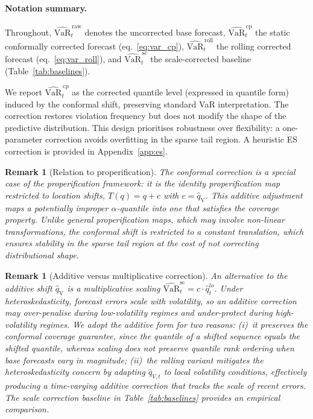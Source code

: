 \documentclass[preprint,11pt,authoryear]{elsarticle}
\newtheorem{remark}[theorem]{Remark}
\newcommand{\VaR}{\mathrm{VaR}}
\newcommand{\1}{\boldsymbol{1}}
\newcommand{\qV}{\hat{q}_{\scriptscriptstyle\mathrm{V}}}
\begin{document}
	\paragraph{Notation summary.}
	Throughout, $\widehat{\VaR}^{\,\mathrm{raw}}_t$ denotes the uncorrected base forecast, $\widehat{\VaR}^{\,\mathrm{cp}}_t$ the static conformally corrected forecast (eq.~\ref{eq:var_cp}), $\widehat{\VaR}^{\,\mathrm{roll}}_t$ the rolling corrected forecast (eq.~\ref{eq:var_roll}), and $\widehat{\VaR}^{\,\mathrm{sc}}_t$ the scale-corrected baseline (Table~\ref{tab:baselines}).

	We report $\widehat{\VaR}_t^{\,\mathrm{cp}}$ as the corrected quantile level (expressed in quantile form) induced by the conformal shift, preserving standard VaR interpretation.
	The correction restores violation frequency but does not
	modify the shape of the predictive distribution. This design
	prioritises robustness over flexibility: a one-parameter
	correction avoids overfitting in the sparse tail region. A
	heuristic ES correction is provided in
	Appendix~\ref{app:es}.
	
	\begin{remark}[Relation to properification]
		The conformal correction is a special case of the
		\citet{brehmer2021properification} properification framework:
		it is the identity properification map restricted to location
		shifts, $T(q) = q + c$ with $c = \qV$. This additive
		adjustment maps a potentially improper $\alpha$-quantile into
		one that satisfies the coverage property. Unlike general
		properification maps, which may involve non-linear
		transformations, the conformal shift is restricted to a
		constant translation, which ensures stability in the
		sparse tail region at the cost of not correcting
		distributional shape.
	\end{remark}
	
	\begin{remark}[Additive versus multiplicative correction]
		An alternative to the additive shift $\qV$ is a
		multiplicative scaling
		$\widehat{\VaR}_t^{\mathrm{sc}} = c \cdot
		\hat{q}_t^{lo}$. Under heteroskedasticity, forecast errors
		scale with volatility, so an additive correction may
		over-penalise during low-volatility regimes and
		under-protect during high-volatility regimes. We adopt the
		additive form for two reasons: (i)~it preserves the
		conformal coverage guarantee, since the quantile of a
		shifted sequence equals the shifted quantile, whereas
		scaling does not preserve quantile rank ordering when base
		forecasts vary in magnitude; (ii)~the rolling variant
		mitigates the heteroskedasticity concern by adapting
		$\hat{q}_{V,t}$ to local volatility conditions, effectively
		producing a time-varying additive correction that tracks the
		scale of recent errors. The scale correction baseline in
		Table~\ref{tab:baselines} provides an empirical comparison.
	\end{remark}
\end{document}
